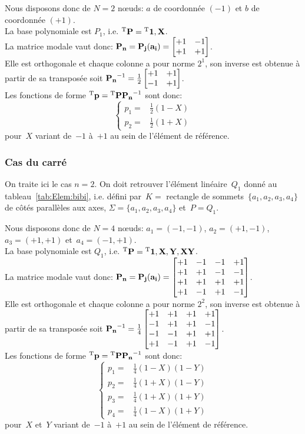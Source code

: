 \medskip
Nous disposons donc de $N=2$ nœuds: $a$ de coordonnée $(-1)$ et $b$ de coordonnée $(+1)$.\\
La base polynomiale est $P_1$, i.e. ${}^\mathrm{T}\mathbf{P}={}^\mathrm{T}\mathbf{1, X}$.\\
La matrice modale vaut donc:
$\MM{P_n}=\MM{P_j(a_i)}=\MM*{+1 & -1\\+1 & +1}$.\\
Elle est orthogonale et chaque colonne a pour norme $2^1$, son inverse est obtenue à partir de sa transposée soit $\MMI{P_n}=\frac12\MM*{+1 & +1\\-1 & +1}$.\\
Les fonctions de forme $\LL{p}=\LL{P}\MMI{P_n}$ sont donc:
\begin{equation}
\left\{
\begin{array}{lr}
p_1= & \frac12(1-X)\\
p_2= & \frac12(1+X)
\end{array}
\right.
\end{equation}
pour~$X$ variant de~$-1$ à~$+1$ au sein de l'élément de référence.

\medskip
\subsubsection{Cas du carré}
On traite ici le cas $n=2$.
On doit retrouver l'élément linéaire~$Q_1$ donné au tableau~\ref{tab:Elem:bibi}, i.e. défini par~$K =$ rectangle de sommets~$\{a_1, a_2, a_3, a_4\}$ de côtés parallèles aux axes, $\Sigma = \{a_1, a_2, a_3, a_4\}$ et~$P =Q_1$.

\medskip
Nous disposons donc de $N=4$ nœuds: $a_1=(-1,-1)$,  $a_2=(+1,-1)$, $a_3=(+1,+1)$ et~$a_4=(-1,+1)$.\\
La base polynomiale est $Q_1$, i.e. ${}^\mathrm{T}\mathbf{P}={}^\mathrm{T}\mathbf{1, X, Y, XY}$.\\
La matrice modale vaut donc:
$\MM{P_n}=\MM{P_j(a_i)}=\MM*{+1 & -1 & -1 & +1\\
                             +1 & +1 & -1 & -1\\
                             +1 & +1 & +1 & +1\\
                             +1 & -1 & +1 & -1}$.\\
Elle est orthogonale et chaque colonne a pour norme $2^2$, son inverse est obtenue à partir de sa transposée soit
$\MMI{P_n}=\frac14\MM*{+1 & +1 & +1 & +1\\
                       -1 & +1 & +1 & -1\\
                       -1 & -1 & +1 & +1\\
                       +1 & -1 & +1 & -1}$.\\
Les fonctions de forme $\LL{p}=\LL{P}\MMI{P_n}$ sont donc:
\begin{equation}
\left\{
\begin{array}{lr}
p_1= & \frac14(1-X)(1-Y)\\
p_2= & \frac14(1+X)(1-Y)\\
p_3= & \frac14(1+X)(1+Y)\\
p_4= & \frac14(1-X)(1+Y)
\end{array}
\right.
\end{equation}
pour~$X$ et~$Y$ variant de~$-1$ à~$+1$ au sein de l'élément de référence.


